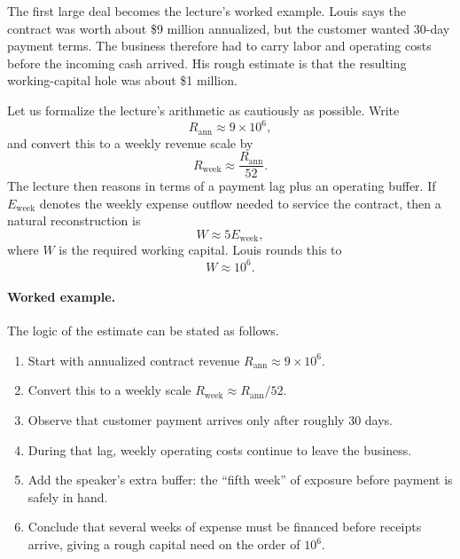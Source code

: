 The first large deal becomes the lecture's worked example. Louis says the contract was worth about \$9 million annualized, but the customer wanted 30-day payment terms. The business therefore had to carry labor and operating costs before the incoming cash arrived. His rough estimate is that the resulting working-capital hole was about \$1 million.

Let us formalize the lecture's arithmetic as cautiously as possible. Write
\begin{equation}
R_{\mathrm{ann}} \approx 9\times 10^6,
\end{equation}
and convert this to a weekly revenue scale by
\begin{equation}
R_{\mathrm{week}} \approx \frac{R_{\mathrm{ann}}}{52}.
\end{equation}
The lecture then reasons in terms of a payment lag plus an operating buffer. If \(E_{\mathrm{week}}\) denotes the weekly expense outflow needed to service the contract, then a natural reconstruction is
\begin{equation}
W \approx 5E_{\mathrm{week}},
\end{equation}
where \(W\) is the required working capital. Louis rounds this to
\begin{equation}
W \approx 10^6.
\end{equation}

\paragraph{Worked example.}
The logic of the estimate can be stated as follows.
\begin{enumerate}
\item Start with annualized contract revenue \(R_{\mathrm{ann}} \approx 9\times 10^6\).
\item Convert this to a weekly scale \(R_{\mathrm{week}} \approx R_{\mathrm{ann}}/52\).
\item Observe that customer payment arrives only after roughly 30 days.
\item During that lag, weekly operating costs continue to leave the business.
\item Add the speaker's extra buffer: the ``fifth week'' of exposure before payment is safely in hand.
\item Conclude that several weeks of expense must be financed before receipts arrive, giving a rough capital need on the order of \(10^6\).
\end{enumerate}

